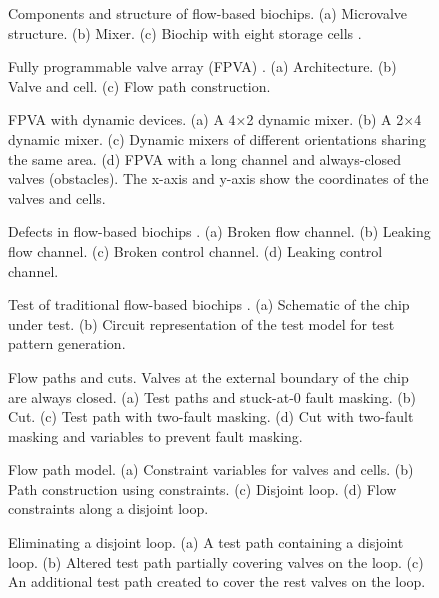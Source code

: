 \begin{figure}[t]\caption{Components and structure of flow-based biochips. (a) Microvalve structure. (b) Mixer. (c) Biochip with eight storage cells \cite{AminTA09}.}\end{figure}


\begin{figure}[t]\caption{Fully programmable valve array (FPVA) \cite{matrix11}.  (a) Architecture. (b) Valve and cell. (c) Flow path construction. }\end{figure}


\begin{figure}[t]\caption{FPVA with dynamic devices. (a) A 4$\times$2 dynamic mixer.  (b) A 2$\times$4 dynamic mixer. (c) Dynamic mixers of different orientations sharing the same area. (d) FPVA with a long channel and always-closed valves (obstacles). The x-axis and y-axis show the coordinates of the valves and cells.}\end{figure}


\begin{figure}[t]\caption{Defects in flow-based biochips \cite{HuYHC14}. (a) Broken flow channel. (b) Leaking flow channel. (c) Broken control channel. (d) Leaking control channel.}\end{figure}


\begin{figure}[t]\caption{Test of traditional flow-based biochips \cite{HuYHC14}. (a) Schematic of the chip under test. (b) Circuit representation of the test model for test pattern generation.}\end{figure}


\begin{figure}[t]\caption{Flow paths and cuts. Valves at the external boundary of the chip are always closed. (a) Test paths and stuck-at-0 fault masking. (b) Cut.  (c) Test path with two-fault masking. (d) Cut with two-fault masking and variables to prevent fault masking.}\end{figure}


\begin{figure}[t]\caption{Flow path model. (a) Constraint variables for valves and cells. (b) Path construction using constraints. (c) Disjoint loop. (d) Flow constraints along a disjoint loop.}\end{figure}


\begin{figure}[t]\caption{Eliminating a disjoint loop. (a) A test path containing a disjoint loop.  (b) Altered test path partially covering valves on the loop. (c) An additional test path created to cover the rest valves on the loop.}\end{figure}


